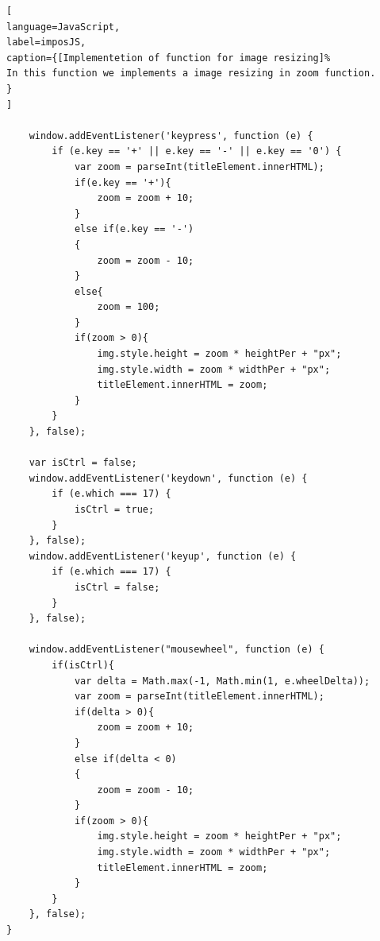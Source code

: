 \begin{lstlisting}[
language=JavaScript,
label=imposJS,
caption={[Implementetion of function for image resizing]%
In this function we implements a image resizing in zoom function.
}
]
	
	window.addEventListener('keypress', function (e) {
		if (e.key == '+' || e.key == '-' || e.key == '0') {
			var zoom = parseInt(titleElement.innerHTML);
			if(e.key == '+'){
				zoom = zoom + 10;
			}
			else if(e.key == '-')
			{
				zoom = zoom - 10;
			}
			else{
				zoom = 100;
			}
			if(zoom > 0){
				img.style.height = zoom * heightPer + "px";
				img.style.width = zoom * widthPer + "px";
				titleElement.innerHTML = zoom;
			}
		}
	}, false);

	var isCtrl = false;
	window.addEventListener('keydown', function (e) {
		if (e.which === 17) {
            isCtrl = true;
        }
    }, false);
	window.addEventListener('keyup', function (e) {
		if (e.which === 17) {
            isCtrl = false;
        }
    }, false);

	window.addEventListener("mousewheel", function (e) {
		if(isCtrl){
			var delta = Math.max(-1, Math.min(1, e.wheelDelta));
			var zoom = parseInt(titleElement.innerHTML);
			if(delta > 0){
				zoom = zoom + 10;
			}
			else if(delta < 0)
			{
				zoom = zoom - 10;
			}
			if(zoom > 0){
				img.style.height = zoom * heightPer + "px";
				img.style.width = zoom * widthPer + "px";
				titleElement.innerHTML = zoom;
			}
		}
	}, false);
}
\end{lstlisting}